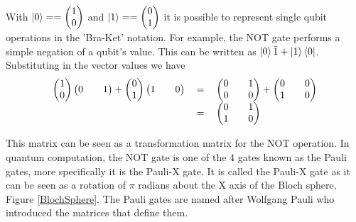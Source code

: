 With
$\left\vert{0}\right\rangle
== 
\begin {pmatrix}
1\\
0\\
\end{pmatrix}
$
and
$\left\vert{1}\right\rangle
==  
\begin {pmatrix}
0\\
1\\
\end{pmatrix}
$
it is possible to represent single qubit operations in the 'Bra-Ket' notation.
For example, the NOT gate performs a simple negation of a qubit's value.
This can be written as $\left\vert{0}\right\rangle\bar{1} + \left\vert{1}\right\rangle\left\langle{0}\right\vert$.
Substituting in the vector values we have
\begin{equation}
\begin{tabular}{ r c l }
\(\begin {pmatrix}
1\\
0
\end{pmatrix}
\begin {pmatrix}
0&&
1
\end{pmatrix}
 + 
\begin {pmatrix}
0\\
1
\end{pmatrix}
\begin {pmatrix}
1&&
0
\end{pmatrix}\)
& \(=\)
& \( 
\begin{pmatrix}
0 && 1 \\
0 && 0
\end{pmatrix}
 + 
\begin{pmatrix}
0 && 0\\
1 && 0
\end{pmatrix}
\) \\
& \(=\)
& \( 
\begin{pmatrix}
0 && 1 \\
1 && 0
\end{pmatrix}
\)
\end{tabular}
\label{eq:notexplanded}
\end{equation}

This matrix can be seen as a transformation matrix for the NOT operation.
In quantum computation, the NOT gate is one of the $4$ gates known as the Pauli gates, more specifically it is the Pauli-X gate.
It is called the Pauli-X gate as it can be seen as a rotation of $\pi$ radians about the X axis of the Bloch sphere, Figure \ref{BlochSphere}.
The Pauli gates are named after Wolfgang Pauli who introduced the matrices that define them.

